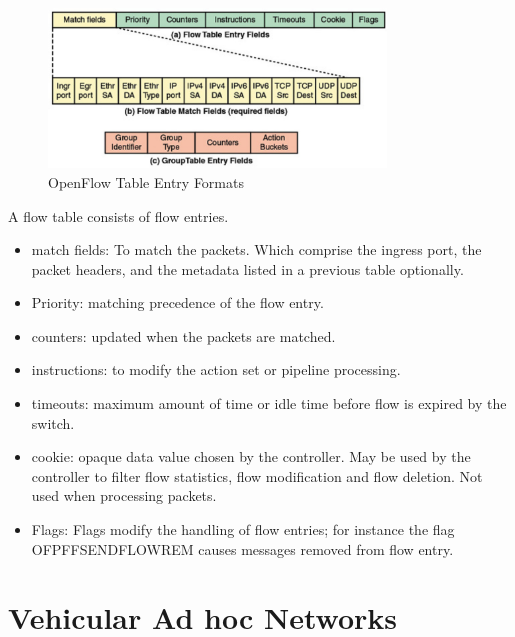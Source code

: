 \documentclass[
  oneside,
  11pt, a4paper,
  footinclude=true,
  headinclude=true,
  cleardoublepage=empty
]{scrbook}
\begin{document}
\begin{figure}[H]
\begin{center}
  \includegraphics[width=0.8\textwidth]{img/grtable.png}
\end{center}
  \caption{OpenFlow Table Entry Formats ~\cite{stallings2015foundations}}
  \centering  
\label{OpenFlow-Table-Entry-Formats}
\end{figure}


A flow table consists of flow entries.

\begin{itemize}
    \item 
    match fields: To match the packets. Which comprise the ingress port, the packet headers, and the metadata listed in a previous table optionally.
    \item
    Priority: matching precedence of the flow entry.
    \item
    counters: updated when the packets are matched.
    \item
    instructions: to modify the action set or pipeline processing.
    \item
    timeouts: maximum amount of time or idle time before flow is expired by the switch.
    \item
    cookie: opaque data value chosen by the controller. May be used by the controller to filter flow statistics, flow modification and flow deletion. Not used when processing packets.
    
    \item
    Flags: Flags modify the handling of flow entries; for instance the flag OFPFFSENDFLOWREM causes messages removed from flow entry.
\end{itemize}



\section{Vehicular Ad hoc Networks}
\label{Vehicular Ad hoc Networks}
\end{document}
